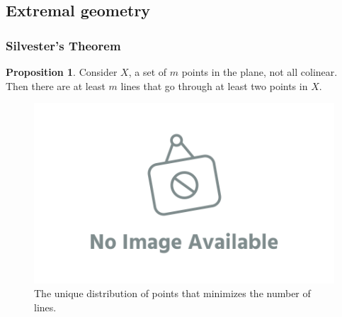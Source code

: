 \documentclass[12pt]{amsart}
\theoremstyle{definition}
\newtheorem{prop}[thm]{Proposition}
\begin{document}
\subsection{Extremal geometry}

\subsubsection*{Silvester's Theorem}

\begin{prop}
Consider $X$, a set of $m$ points in the plane, not all colinear.
Then there are at least $m$ lines that go through at least two points in $X$.
\end{prop}

\begin{figure}[h]
\includegraphics[scale=.1]{../imgs/ina.png}%
\caption{The unique distribution of points that minimizes the number of lines.\label{fig:sylvester}}
\end{figure}
\end{document}

